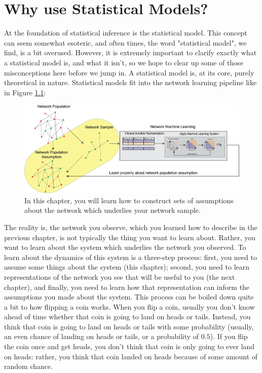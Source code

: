 \chapter{Why use Statistical Models?}
\label{sec:ch5}

At the foundation of statistical inference is the statistical model. This concept can seem somewhat esoteric, and often times, the word "statistical model", we find, is a bit overused. However, it is extremely important to clarify exactly what a statistical model is, and what it isn't, so we hope to clear up some of those misconceptions here before we jump in. A statistical model is, at its core, {purely theoretical} in nature. Statistical models fit into the network learning pipeline like in Figure \ref{fig:ch5:netmodels}:
\begin{figure}[h]
    \centering
    \includegraphics[width=\linewidth]{representations/ch5/Images/network_modelling.png}
    \caption[Network modelling schematic]{In this chapter, you will learn how to construct sets of assumptions about the network which underlies your network sample.}
    \label{fig:ch5:netmodels}
\end{figure}

The reality is, the network you observe, which you learned how to describe in the previous chapter, is not {typically} the thing you want to learn about. Rather, you want to learn about the {system} which underlies the network you observed. To learn about the dynamics of this system is a three-step process: first, you need to assume some things about the system (this chapter); second, you need to learn representations of the network you see that will be useful to you (the next chapter), and finally, you need to learn how that representation can inform the assumptions you made about the system. This process can be boiled down quite a bit to how flipping a coin works. When you flip a coin, usually you don't know ahead of time whether that coin is going to land on heads or tails. Instead, you think that coin is going to land on heads or tails with some probability (usually, an even chance of landing on heads or tails, or a probability of $0.5$). If you flip the coin once and get heads, you don't think that coin is {only} going to ever land on heads: rather, you think that coin landed on heads because of some amount of random chance. 

